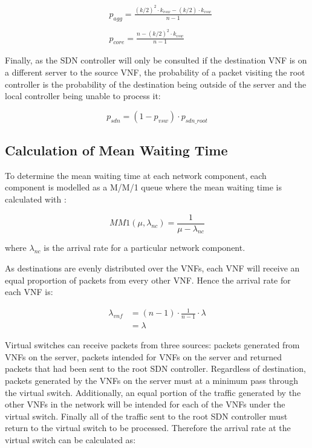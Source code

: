 \begin{align}
\label{eq:p_agg_core}
&p_{agg} = \frac{(k/2)^2 \cdot k_{vsw} - (k/2) \cdot k_{vsw}}{n - 1} \\ \nonumber \\
&p_{core} = \frac{n - (k/2)^2 \cdot k_{vsw}}{n - 1}
\end{align}

Finally, as the SDN controller will only be consulted if the destination VNF is on a different server to the source VNF, the probability of a packet visiting the root controller is the probability of the destination being outside of the server and the local controller being unable to process it:

\begin{equation}
\label{eq:p_sdn}
p_{sdn} = (1 - p_{vsw}) \cdot p_{sdn\_root}
\end{equation}

\subsection{Calculation of Mean Waiting Time}
To determine the mean waiting time at each network component, each component is modelled as a M/M/1 queue where the mean waiting time is calculated with \cite{Kleinrock75}:

\begin{equation}
\label{eq:MM1_time_in_network}
MM1(\mu, \lambda_{nc}) = \frac{1}{\mu - \lambda_{nc}}
\end{equation}

where $\lambda_{nc}$ is the arrival rate for a particular network component.

As destinations are evenly distributed over the VNFs, each VNF will receive an equal proportion of packets from every other VNF. Hence the arrival rate for each VNF is:

\begin{equation}
\label{eq:arr_vnf}
\begin{split}
\lambda_{vnf} &= (n - 1) \cdot \frac{1}{n - 1} \cdot \lambda \\
			  &= \lambda
\end{split}
\end{equation}

Virtual switches can receive packets from three sources: packets generated from VNFs on the server, packets intended for VNFs on the server and returned packets that had been sent to the root SDN controller. Regardless of destination, packets generated by the VNFs on the server must at a minimum pass through the virtual switch. Additionally, an equal portion of the traffic generated by the other VNFs in the network will be intended for each of the VNFs under the virtual switch. Finally all of the traffic sent to the root SDN controller must return to the virtual switch to be processed. Therefore the arrival rate at the virtual switch can be calculated as:

